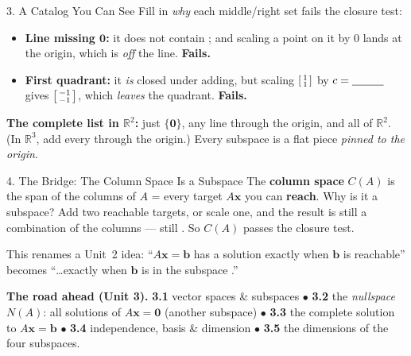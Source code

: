 \documentclass[10pt]{article}
\newcommand{\zero}{\mathbf{0}}
\begin{document}
\begin{notesbox}{3. A Catalog You Can See}
\vspace{2pt}
Fill in \emph{why} each middle/right set fails the closure test:
\begin{itemize}[leftmargin=1.5em, itemsep=2pt]
  \item \textbf{Line missing $\zero$:} it does not contain \blank{1.6cm}; and scaling a point on
        it by $0$ lands at the origin, which is \emph{off} the line. \textbf{Fails.}
  \item \textbf{First quadrant:} it \emph{is} closed under adding, but scaling
        $\begin{bsmallmatrix} 1\\1 \end{bsmallmatrix}$ by $c=\blank{1.0cm}$ gives
        $\begin{bsmallmatrix} -1\\-1 \end{bsmallmatrix}$, which \emph{leaves} the quadrant.
        \textbf{Fails.}
\end{itemize}
\textbf{The complete list in $\mathbb{R}^2$:} just $\{\zero\}$, any line through the origin, and
all of $\mathbb{R}^2$. (In $\mathbb{R}^3$, add every \blank{2.6cm} through the origin.) Every
subspace is a flat piece \emph{pinned to the origin}.
\end{notesbox}

\begin{notesbox}{4. The Bridge: The Column Space Is a Subspace}
The \textbf{column space} $C(A)$ is the span of the columns of $A$ = every target $A\mathbf x$ you
can \textbf{reach}. Why is it a subspace? Add two reachable targets, or scale one, and the result
is still a combination of the columns --- still \blank{2.6cm}. So $C(A)$ passes the closure test.

\vspace{3pt}
This renames a Unit~2 idea: ``$A\mathbf x=\mathbf b$ has a solution exactly when $\mathbf b$ is
reachable'' becomes ``\dots exactly when $\mathbf b$ is in the subspace \blank{2.0cm}.''

\vspace{3pt}
\textbf{The road ahead (Unit 3).} \textbf{3.1} vector spaces \& subspaces\; $\bullet$\;
\textbf{3.2} the \emph{nullspace} $N(A)$: all solutions of $A\mathbf x=\zero$ (another subspace)\;
$\bullet$\; \textbf{3.3} the complete solution to $A\mathbf x=\mathbf b$\; $\bullet$\; \textbf{3.4}
independence, basis \& dimension\; $\bullet$\; \textbf{3.5} the dimensions of the four subspaces.
\end{notesbox}
\end{document}
